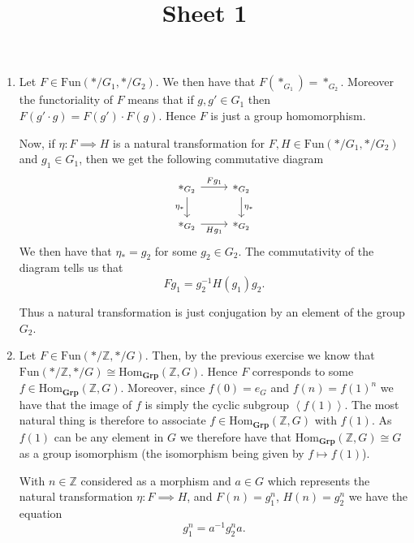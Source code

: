 \documentclass[a4paper]{article}
\title{Sheet 1}
\begin{document}
\maketitle
\begin{exercise}{2}
  \begin{enumerate}[label=(\alph*)]
    \item Let $ F \in \text{Fun}(*/G_1, */G_2) $. We then have
      that $ F(*_{G_1}) = *_{G_2} $. Moreover the functoriality of $ F $ means that if $ g, g' \in G_1 $ then $ F(g' \cdot g) = F(g')\cdot F(g) $. Hence $ F $ is just a group homomorphism.

      Now, if $ \eta: F \implies H $ is a natural transformation for $ F,H \in \text{Fun}(*/G_1, */G_2) $ and $ g_1 \in G_1 $, then we get the following commutative diagram
      \[\begin{tikzcd}
	      {*_{G_2}} & {*_{G_2}} \\
	      {*_{G_2}} & {*_{G_2}}
	      \arrow["Fg_1", from=1-1, to=1-2]
	      \arrow["{\eta_*}"', from=1-1, to=2-1]
	      \arrow["{\eta_*}", from=1-2, to=2-2]
	      \arrow["Hg_1"', from=2-1, to=2-2]
      \end{tikzcd}\]
      We then have that $ \eta_* = g_2 $ for some $ g_2 \in G_2  $. The commutativity of the diagram tells us that
      \begin{equation*}
      Fg_1 = g_2^{-1} H(g_1) g_2
      .\end{equation*}

      Thus a natural transformation is just conjugation by an element of the group $ G_2 $.

    \item Let $ F \in \text{Fun}(*/\mathbb{Z}, */G) $. Then, by the previous exercise we know that $ \text{Fun}(*/\mathbb{Z}, */G) \cong \text{Hom}_{\mathbf{Grp}}(\mathbb{Z}, G) $. Hence $ F $ corresponds to some $ f \in \text{Hom}_\mathbf{Grp}(\mathbb{Z}, G) $. Moreover, since $ f(0) = e_G $ and $ f(n) = f(1)^{n} $ we have that the image of $ f $ is simply the cyclic subgroup $ \left\langle f(1) \right\rangle $. The most natural thing is therefore to associate $ f \in \text{Hom}_{\mathbf{Grp}}(\mathbb{Z}, G) $ with $ f(1) $. As $ f(1) $ can be any element in $ G $ we therefore have that $ \text{Hom}_\mathbf{Grp}(\mathbb{Z}, G) \cong G $ as a group isomorphism (the isomorphism being given by $ f \mapsto f(1) $).

      With $ n \in \mathbb{Z} $ considered as a morphism and $ a \in G $ which represents the natural transformation $ \eta: F \implies H $, and $ F(n) = g_1^{n} $, $ H(n) = g_2^{n} $
      we have the equation
      \begin{equation*}
      g_1^{n} = a^{-1}g_2^{n}a
      .\end{equation*}


\end{enumerate}
\end{exercise}
\end{document}
